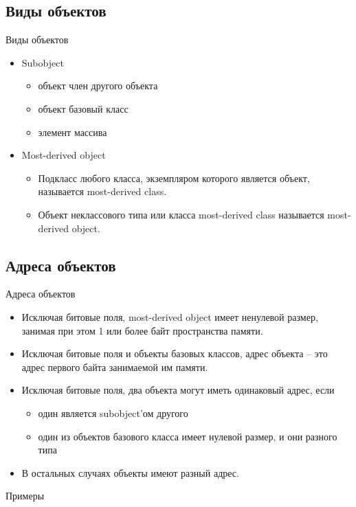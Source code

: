 \documentclass[xetex,mathserif,serif,10pt]{beamer}
\begin{document}
    \subsection{Виды объектов}
    \begin{frame}{Виды объектов}
        \begin{itemize}
            \item Subobject
                \begin{itemize}
                    \item объект член другого объекта
                    \item объект базовый класс
                    \item элемент массива
                \end{itemize}
            \item Most-derived object
                \begin{itemize}
                    \item Подкласс любого класса, экземпляром которого является объект, называется most-derived class.
                    \item Объект неклассового типа или класса most-derived class называется most-derived object.
                \end{itemize}
        \end{itemize}
    \end{frame}
    \subsection{Адреса объектов}
    \begin{frame}{Адреса объектов}
        \begin{itemize}
            \item Исключая битовые поля, most-derived object имеет ненулевой размер, занимая при этом 1 или более байт
                пространства памяти.
            \item Исключая битовые поля и объекты базовых классов, адрес объекта -- это адрес первого байта занимаемой им памяти.
            \item Исключая битовые поля, два объекта могут иметь одинаковый адрес, если
                \begin{itemize}
                    \item один является subobject'ом другого
                    \item один из объектов базового класса имеет нулевой размер, и они разного типа
                \end{itemize}
            \item В остальных случаях объекты имеют разный адрес.
        \end{itemize}
    \end{frame}
    \begin{frame}{Примеры}
        
    \end{frame}
\end{document}
